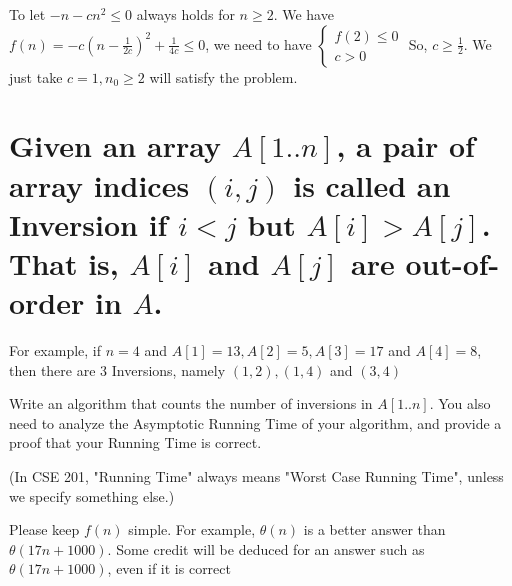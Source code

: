 \documentclass[a4paper]{article}
\begin{document}
To let $-n-cn^2\leq 0$ always holds for $n\geq 2$. We have $f(n)= -c(n-\frac 1{2c})^2+\frac1{4c}\leq0$, we need to have
$\begin{cases}
    f(2) \leq 0 \\
    c>0
  \end{cases}$
So, $c\geq \frac 12$. We just take $c=1,n_0\geq 2$ will satisfy the problem.
\section{Given an array $A[1..n]$, a pair of array indices $(i, j)$ is called an Inversion if $i < j$ but $A[i] > A[j]$. That is, $A[i]$ and $A[j]$ are out-of-order in $A$.}

For example, if $n=4$ and $A[1]=13, A[2]=5, A[3]=17$ and $A[4]=8$, then there are 3 Inversions, namely $(1,2),(1,4)$ and $(3,4)$

Write an algorithm that counts the number of inversions in $A[1 . . n]$. You also need to analyze the Asymptotic Running Time of your algorithm, and provide a proof that your Running Time is correct.

(In CSE 201, "Running Time" always means "Worst Case Running Time", unless we specify something else.)

Please keep $f(n)$ simple. For example, $\theta(n)$ is a better answer than $\theta(17 n+1000)$. Some credit will be deduced for an answer such as $\theta(17 n+1000)$, even if it is correct
\end{document}
